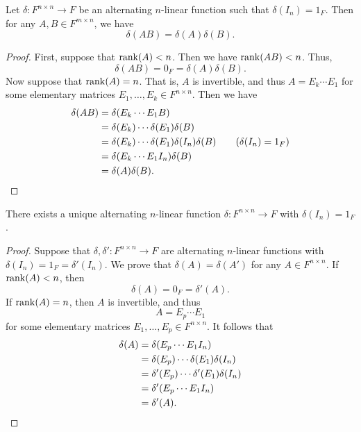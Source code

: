 \begin{theorem}
  \label{thm:determinant-multiplication}
  Let $\delta: F^{n \times n} \to F$ be an alternating $n$-linear function
  such that $\delta(I_n) = 1_F$.
  Then for any $A, B \in F^{m \times n}$, we have
  \begin{equation*}
    \delta(AB) = \delta(A)\delta(B).
  \end{equation*}
\end{theorem}
\begin{proof}
  First, suppose that $\operatorname{rank}(A) < n$.
  Then we have $\operatorname{rank}(AB) < n$.
  Thus,
  \begin{equation*}
    \delta(AB) = 0_F = \delta(A)\delta(B).
  \end{equation*}
  Now suppose that $\operatorname{rank}(A) = n$.
  That is, $A$ is invertible, and thus $A = E_k \cdots E_1$ for some elementary
  matrices $E_1, \dots, E_k \in F^{n \times n}$.
  Then we have
  \begin{align*}
    \delta(AB)
    &= \delta(E_k \cdots E_1B) \\
    &= \delta(E_k) \cdots \delta(E_1)\delta(B) \\
    &= \delta(E_k) \cdots \delta(E_1)\delta(I_n)\delta(B)
       \tag{$\delta(I_n) = 1_F$} \\
    &= \delta(E_k \cdots E_1I_n)\delta(B) \\
    &= \delta(A)\delta(B).
    \qedhere
  \end{align*}
\end{proof}

\begin{theorem}
  \label{thm:determinant-uniqueness}
  There exists a unique alternating $n$-linear function
  $\delta: F^{n \times n} \to F$ with $\delta(I_n) = 1_F$.
\end{theorem}
\begin{proof}
  Suppose that $\delta, \delta': F^{n \times n} \to F$ are alternating
  $n$-linear functions with $\delta(I_n) = 1_F = \delta'(I_n)$.
  We prove that $\delta(A) = \delta(A')$ for any $A \in F^{n \times n}$.
  If $\operatorname{rank}(A) < n$, then
  \begin{equation*}
    \delta(A) = 0_F = \delta'(A).
  \end{equation*}
  If $\operatorname{rank}(A) = n$, then $A$ is invertible, and thus
  \begin{equation*}
    A = E_p \cdots E_1
  \end{equation*}
  for some elementary matrices $E_1, \dots, E_p \in F^{n \times n}$.
  It follows that
  \begin{align*}
    \delta(A)
    &= \delta(E_p \cdots E_1I_n) \\
    &= \delta(E_p)\cdots\delta(E_1)\delta(I_n) \\
    &= \delta'(E_p)\cdots\delta'(E_1)\delta(I_n) \\
    &= \delta'(E_p \cdots E_1I_n) \\
    &= \delta'(A).
    \qedhere
  \end{align*}
\end{proof}

